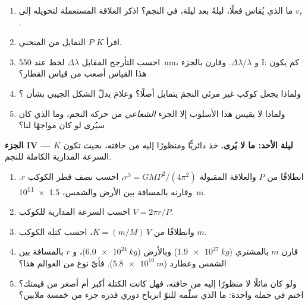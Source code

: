 \begin{problem}
\begin{enumerate}[resume]
  \item ما الذي يُقاس فعلًا، ليلةً بعد ليلة، في \emph{} النجم؟ اذكر
        العلاقة المستعملة لتحويله إلى $v_r$.
  \item اقرأ  $K$  $P$ التمايل من المنحني.
  \item احسب التأرجح المقابل $\Delta\lambda$ لخط عند \qty{550}{nm}، و
        $\Delta\lambda/\lambda$. وقارن بالجزء I: كم يكون هذا القياس أصعب
        من قياس القطار؟
  \item ولماذا يجعل كوكب غير مرئي النجمَ يتمايل أصلًا؟ وعلامَ يدلّ الشكل
        الجيبي بشأن ؟
  \item ولماذا لا يقيس هذا الأسلوب إلا الجزء \emph{الشعاعي} من حركة النجم، وما
        الذي كان سيُرى لو كان  مواجهًا لنا؟
\end{enumerate}

\medskip
\noindent\textbf{الجزء IV --- ليلة الأحد:  ما لا يُرى.}
خذ  دائريًّا ومنظورًا إليه من حافته، بحيث تكون $K$ السرعة المدارية الكاملة للنجم.
\begin{enumerate}[resume]
  \item انطلاقًا من $P$ والعلاقة المقبولة $r^3 = G M P^2/(4\pi^2)$، احسب نصف قطر
         الكوكب $r$. وقارنه بالمسافة بين الأرض والشمس، \qty{1.5e11}{m}.
  \item احسب السرعة المدارية للكوكب $V = 2\pi r/P$.
  \item وانطلاقًا من $K = (m/M)\,V$، احسب كتلة الكوكب $m$.
  \item قارن $m$ بالمشتري ($\qty{1.9e27}{kg}$) وبالأرض ($\qty{6.0e24}{kg}$)، و
        $r$ بالمسافة بين الشمس وعطارد ($\qty{5.8e10}{m}$). فأيّ نوع من العوالم هذا؟
  \item ولو كان  مائلًا لا منظورًا إليه من حافته، فهل كانت الكتلة  أكبر أم
        أصغر من قيمتك؟ اختم في جملة واحدة: ما الذي سلّمه للتوّ انزياح دوري قدره جزء
        من خمسة ملايين؟
\end{enumerate}
\end{problem}
